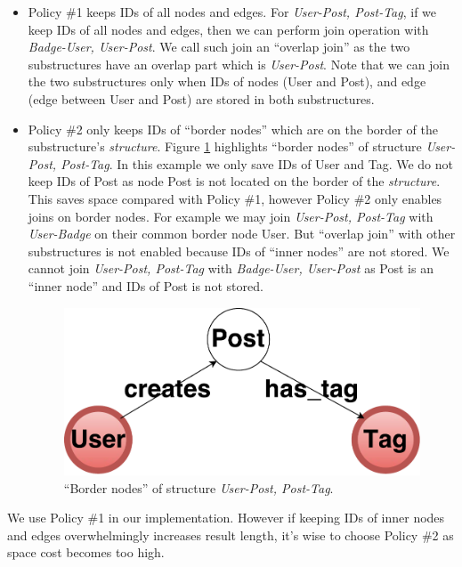 \begin{itemize}
\item Policy \#1 keeps IDs of all nodes and edges. For \textit{User-Post, Post-Tag}, if we keep IDs of all nodes and edges, then we can perform join operation with \textit{Badge-User, User-Post}. We call such join an ``overlap join'' as the two substructures have an overlap part which is \textit{User-Post}. Note that we can join the two substructures only when IDs of nodes (User and Post), and edge (edge between User and Post) are stored in both substructures.

\item Policy \#2 only keeps IDs of ``border nodes'' which are on the border of the substructure's \textit{structure}. Figure \ref{border node} highlights ``border nodes'' of structure \textit{User-Post, Post-Tag}. In this example we only save IDs of User and Tag. We do not keep IDs of Post as node Post is not located on the border of the \textit{structure}. This saves space compared with Policy \#1, however Policy \#2 only enables joins on border nodes. For example we may join \textit{User-Post, Post-Tag} with \textit{User-Badge} on their common border node User. But ``overlap join'' with other substructures is not enabled because IDs of ``inner nodes'' are not stored. We cannot join \textit{User-Post, Post-Tag} with \textit{Badge-User, User-Post} as Post is an ``inner node'' and IDs of Post is not stored. 

\begin{figure}[h]
	\centering
	\includegraphics[scale=0.5]{pic/bordernode.pdf}
	\caption{``Border nodes'' of structure \textit{User-Post, Post-Tag}.}
	\label{border node}
\end{figure}
\end{itemize}


We use Policy \#1 in our implementation. However if keeping IDs of inner nodes and edges overwhelmingly increases result length, it's wise to choose Policy \#2 as space cost becomes too high.

